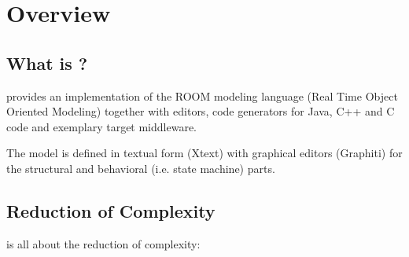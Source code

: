 \section{\eTrice{} Overview}

\subsection{What is \eTrice{}?}

\eTrice{} provides an implementation of the ROOM modeling language (Real Time Object Oriented Modeling) 
together with editors, code generators for Java, C++ and C code and exemplary target middleware.

The model is defined in textual form (Xtext) with graphical editors (Graphiti) for the structural and 
behavioral (i.e. state machine) parts.

\subsection{Reduction of Complexity}

\eTrice{} is all about the reduction of complexity:

